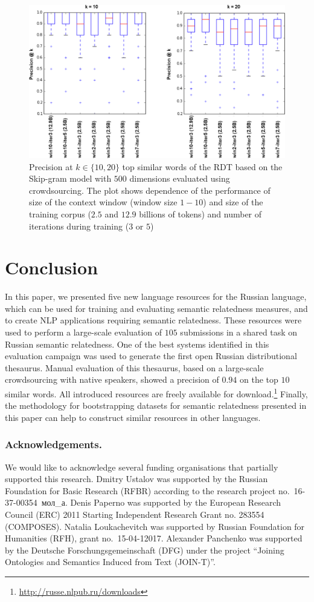 \documentclass[runningheads,a4paper]{llncs}
\begin{document}
\begin{figure}[ht]
\centering
\includegraphics[width=.9\textwidth]{figures/plot}
\caption{Precision at $k \in \{10,20\}$  top similar words of the RDT based on the Skip-gram model with $500$ dimensions evaluated using crowdsourcing. The plot shows dependence of the performance of size of the context window (window size $1-10$) and size of the training corpus ($2.5$ and $12.9$ billions of tokens) and number of iterations during training ($3$ or $5$)}
\label{fig:box}
\end{figure}

\section{Conclusion}

In this paper, we presented five new language resources for the Russian language, which can be used for training and evaluating  semantic relatedness measures, and to create NLP applications requiring semantic relatedness. These resources were used to perform a large-scale evaluation of $105$ submissions in a shared task on Russian semantic relatedness. One of the best systems identified in this evaluation campaign was used to generate the first open Russian distributional thesaurus. Manual evaluation of this thesaurus, based on a large-scale crowdsourcing with native speakers, showed a precision of $0.94$ on the top $10$ similar words. All introduced resources are freely available for download.\footnote{\url{http://russe.nlpub.ru/downloads}} Finally, the methodology for bootstrapping datasets for semantic relatedness presented in this paper can help to construct similar resources in other languages.  

\subsubsection{Acknowledgements.} We would like to acknowledge several funding organisations that partially supported this research. Dmitry Ustalov was supported by the Russian Foundation for Basic Research (RFBR) according to the research project no.~16-37-00354~мол\_а. Denis Paperno was supported by the European Research Council (ERC) 2011 Starting Independent Research Grant no. 283554 (COMPOSES). Natalia Loukachevitch was supported by Russian Foundation for Humanities (RFH), grant no.~15-04-12017. Alexander Panchenko was supported by the Deutsche For\-schungs\-gemeinschaft (DFG) under the project ``Joining Ontologies and Semantics Induced from Text (JOIN-T)''.



\end{document}
